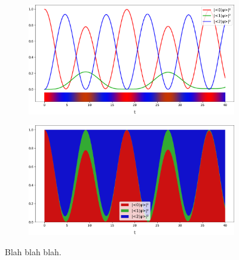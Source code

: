 \begin{figure}[h]
  \begin{subfigure}[b]{\textwidth}
    \centering
    \includegraphics[width=.8\textwidth]{img/3ldetect/hermitian3lines.pdf}
  \end{subfigure}
  \par\bigskip
  \par\bigskip
  \begin{subfigure}[b]{\textwidth}
    \centering
    \includegraphics[width=.8\textwidth]{img/3ldetect/hermitian3color.pdf}
  \end{subfigure}
  \par\bigskip
  \par\bigskip
  \caption{
    Blah blah blah.
  }
\end{figure}



